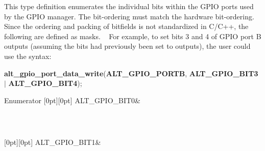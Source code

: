 This type definition enumerates the individual bits within the G\+P\+IO ports used by the G\+P\+IO manager. The bit-\/ordering must match the hardware bit-\/ordering. Since the ordering and packing of bitfields is not standardized in C/\+C++, the following are defined as masks. ~\newline
For example, to set bits 3 and 4 of G\+P\+IO port B outputs (assuming the bits had previously been set to outputs), the user could use the syntax\+: \begin{DoxyParagraph}{}
{\bfseries{alt\+\_\+gpio\+\_\+port\+\_\+data\+\_\+write}}({\bfseries{A\+L\+T\+\_\+\+G\+P\+I\+O\+\_\+\+P\+O\+R\+TB}}, {\bfseries{A\+L\+T\+\_\+\+G\+P\+I\+O\+\_\+\+B\+I\+T3}} {\bfseries{}}$\vert$ {\bfseries{A\+L\+T\+\_\+\+G\+P\+I\+O\+\_\+\+B\+I\+T4}}); 
\end{DoxyParagraph}
\begin{DoxyEnumFields}{Enumerator}
[0pt][0pt]{}\mbox{\label{group__ALT__GPIO__API__CONFIG_gga655ce0b7b808aa71b821439fd82b9796adc07559f2aaa23ed90f951156a6f6430}} 
A\+L\+T\+\_\+\+G\+P\+I\+O\+\_\+\+B\+I\+T0&\subsection*{}\\
\hline

[0pt][0pt]{}\mbox{\label{group__ALT__GPIO__API__CONFIG_gga655ce0b7b808aa71b821439fd82b9796aed59303bcbaf6710d064666fb59b7442}} 
A\+L\+T\+\_\+\+G\+P\+I\+O\+\_\+\+B\+I\+T1&\subsection*{}\\
\hline


\end{DoxyEnumFields}
